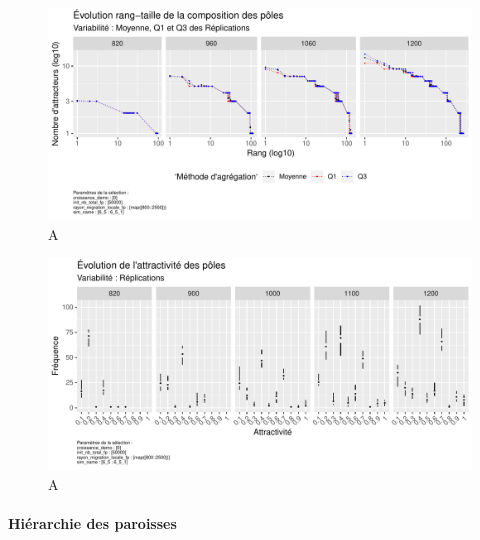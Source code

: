 \begin{figure}[H]
	\centering
	\includegraphics[width=\linewidth]{img/results_6_5_1/Poles_RT_Haut.pdf}
	\caption{A}
	\label{}
\end{figure}
\begin{figure}[H]
	\centering
	\includegraphics[width=\linewidth]{img/results_6_5_1/Poles_Attrac_Haut.pdf}
	\caption{A}
	\label{}
\end{figure}

\paragraph{Hiérarchie des paroisses}~\\

